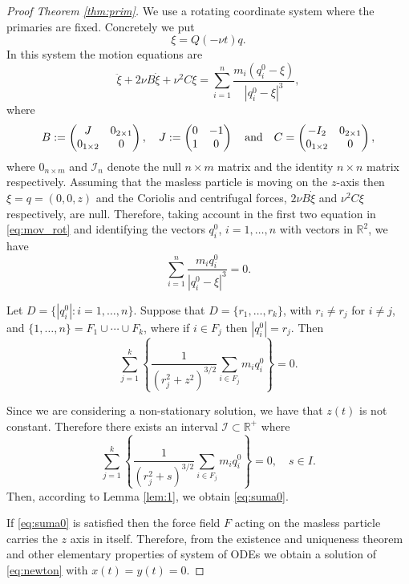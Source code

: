 \documentclass[twoside]{article}
\theoremstyle{remark}
\newcommand{\rr}{\mathbb{R}}
\begin{document}
\begin{proof} [Proof Theorem \ref{thm:prim}] We use a rotating coordinate system where the primaries are fixed. Concretely we  put
\[\xi=Q(-\nu t)q.\]
In this system the motion equations are
\begin{equation}\label{eq:mov_rot}\ddot{\xi}+2\nu B\dot{\xi}+\nu^2 C\xi=\sum_{i=1}^n\frac{m_i(q_i^0-\xi)}{|q_i^0-\xi|^3},\end{equation}
where
\[B:=\begin{pmatrix}
       J & 0_{2\times 1}\\
       0_{1\times 2} & 0\\
     \end{pmatrix},\quad J:=\begin{pmatrix}
       0 & -1\\
       1 & 0\\
     \end{pmatrix}\quad\hbox{and}\quad C=\begin{pmatrix}
       -I_{2} & 0_{2\times 1}\\
       0_{1\times 2} & 0\\
     \end{pmatrix},
\]
where $0_{n\times m}$ and $\mathcal{I}_{n}$ denote the null $n\times m$ matrix  and the identity $n\times n$ matrix respectively. Assuming that the masless particle is moving on the $z$-axis then $\xi=q=(0,0,z)$ and the Coriolis and centrifugal forces,   $2\nu B\dot{\xi}$ and $\nu^2 C\xi$ respectively, are null. Therefore, taking account in the first two equation in \eqref{eq:mov_rot} and identifying the vectors $q_i^0$, $i=1,\ldots,n$ with vectors in $\rr^2$, we have
\[
\sum_{i=1}^n\frac{m_iq_i^0}{|q_i^0-\xi|^3}=0.
\]

Let $D=\{|q_i^0|: i=1,\ldots,n\}$.  Suppose that $D=\{r_1,\ldots,r_k\}$, with $r_i\neq r_j$ for $i\neq j$, and  $\{1,\ldots,n\}=F_1\cup \cdots\cup F_k$, where if $i\in F_j$ then $|q_i^0|=r_j$. Then
\[\sum_{j=1}^k\left\{\frac{1}{(r_j^{2}+z^2)^{3/2}}\sum_{i\in F_j}m_iq_i^0\right\}=0.\]

Since we are considering a non-stationary solution, we have that $z(t)$ is not constant. Therefore there exists an interval $\mathcal{I}\subset\rr^+$ where
\[\sum_{j=1}^k\left\{\frac{1}{(r_j^{2}+s)^{3/2}}\sum_{i\in F_j}m_iq_i^0\right\}=0,\quad s\in I.\]
Then, according to Lemma \ref{lem:1}, we obtain \eqref{eq:suma0}.

If  \eqref{eq:suma0} is satisfied then the force field $F$ acting on the masless
particle carries the $z$ axis in itself. Therefore, from the existence and uniqueness theorem and other elementary properties of system of ODEs we obtain a solution  of \eqref{eq:newton} with $x(t)=y(t)=0$.  \end{proof}
\end{document}

